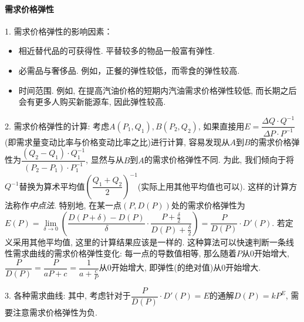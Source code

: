 \paragraph{需求价格弹性}

1. 需求价格弹性的影响因素：

\begin{itemize}
	\item 相近替代品的可获得性. 平替较多的物品一般富有弹性. 
	\item 必需品与奢侈品. 例如，正餐的弹性较低，而零食的弹性较高. 
	\item 时间范围. 例如, 在提高汽油价格的短期内汽油需求价格弹性较低, 而长期之后会有更多人购买新能源车, 因此弹性较高. 
\end{itemize}

2. 需求价格弹性的计算: 考虑$A(P_1,Q_1),B(P_2,Q_2)$, 如果直接用$E=\dfrac{\Delta Q \cdot Q^{-1}}{\Delta P \cdot P^{-1}}$(即需求量变动比率与价格变动比率之比)进行计算, 容易发现从$A$到$B$的需求价格弹性为$\dfrac{(Q_2-Q_1) \cdot Q_1^{-1}}{(P_2-P_1) \cdot P_1^{-1}}$, 显然与从$B$到$A$的需求价格弹性不同. 为此, 我们倾向于将$Q^{-1}$替换为算术平均值$\left( \dfrac{Q_1+Q_2}{2} \right)^{-1}$(实际上用其他平均值也可以). 这样的计算方法称作\textit{中点法}. 特别地, 在某一点$(P,D(P))$处的需求价格弹性为$E(P)=\lim\limits_{\delta \to 0} \left( \dfrac{D(P+\delta)-D(P)}{\delta} \cdot \dfrac{P+\frac{\delta}{2}}{D(P)+\frac{\delta}{2}} \right) = \dfrac{P}{D(P)} \cdot D'(P)$. 若定义采用其他平均值, 这里的计算结果应该是一样的. 这种算法可以快速判断一条线性需求曲线的需求价格弹性变化: 每一点的导数值相等, 那么随着$P$从$0$开始增大, $\dfrac{P}{D(P)} = \dfrac{P}{aP+c} = \dfrac{1}{a+\frac{c}{P}}$从$0$开始增大, 即弹性(的绝对值)从$0$开始增大. 

3. 各种需求曲线: 其中, 考虑针对于$\dfrac{P}{D(P)} \cdot D'(P)=E$的通解$D(P)=kP^{E}$, 需要注意需求价格弹性为负. 

